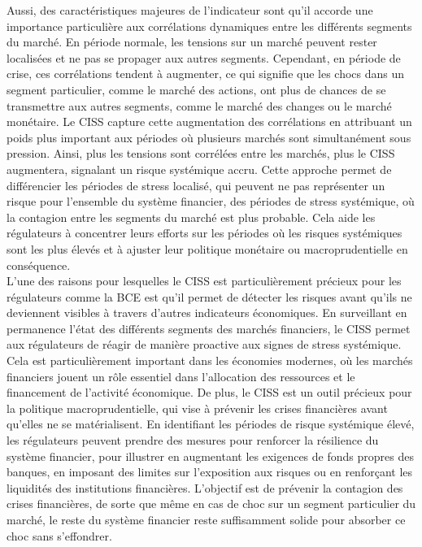 \begin{sloppypar}
Aussi, des caractéristiques majeures de l'indicateur sont qu'il accorde une importance particulière aux corrélations dynamiques entre les différents segments du marché. En période normale, les tensions sur un marché peuvent rester localisées et ne pas se propager aux autres segments. Cependant, en période de crise, ces corrélations tendent à augmenter, ce qui signifie que les chocs dans un segment particulier, comme le marché des actions, ont plus de chances de se transmettre aux autres segments, comme le marché des changes ou le marché monétaire. Le CISS capture cette augmentation des corrélations en attribuant un poids plus important aux périodes où plusieurs marchés sont simultanément sous pression. Ainsi, plus les tensions sont corrélées entre les marchés, plus le CISS augmentera, signalant un risque systémique accru. Cette approche permet de différencier les périodes de stress localisé, qui peuvent ne pas représenter un risque pour l'ensemble du système financier, des périodes de stress systémique, où la contagion entre les segments du marché est plus probable. Cela aide les régulateurs à concentrer leurs efforts sur les périodes où les risques systémiques sont les plus élevés et à ajuster leur politique monétaire ou macroprudentielle en conséquence.\\

L'une des raisons pour lesquelles le CISS est particulièrement précieux pour les régulateurs comme la BCE est qu'il permet de détecter les risques avant qu'ils ne deviennent visibles à travers d'autres indicateurs économiques. En surveillant en permanence l'état des différents segments des marchés financiers, le CISS permet aux régulateurs de réagir de manière proactive aux signes de stress systémique. Cela est particulièrement important dans les économies modernes, où les marchés financiers jouent un rôle essentiel dans l'allocation des ressources et le financement de l'activité économique. De plus, le CISS est un outil précieux pour la politique macroprudentielle, qui vise à prévenir les crises financières avant qu'elles ne se matérialisent. En identifiant les périodes de risque systémique élevé, les régulateurs peuvent prendre des mesures pour renforcer la résilience du système financier, pour illustrer en augmentant les exigences de fonds propres des banques, en imposant des limites sur l'exposition aux risques ou en renforçant les liquidités des institutions financières. L'objectif est de prévenir la contagion des crises financières, de sorte que même en cas de choc sur un segment particulier du marché, le reste du système financier reste suffisamment solide pour absorber ce choc sans s'effondrer.\\


\end{sloppypar}
